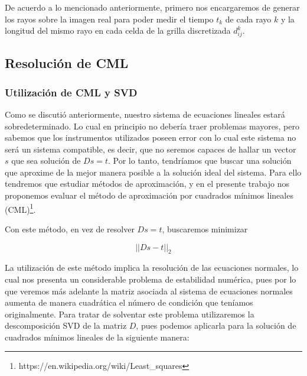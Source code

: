 De acuerdo a lo mencionado anteriormente, primero nos encargaremos de generar los rayos
sobre la imagen real para poder medir el tiempo $t_{k}$ de cada rayo $k$
y la longitud del mismo rayo en cada celda de la grilla discretizada $d^{k}_{ij}$.

\subsection{Resolución de CML}
\label{sec:cml}

\subsubsection{Utilización de CML y SVD} %
\label{sec:intro-cml}
Como se discutió anteriormente, nuestro sistema de ecuaciones lineales estará sobredeterminado.
Lo cual en principio no debería traer problemas mayores, pero sabemos que los instrumentos
utilizados poseen error con lo cual este sistema no será un sistema compatible,
es decir, que no seremos capaces de hallar un vector $s$ que sea solución de $Ds = t$.
Por lo tanto, tendríamos que buscar una solución que aproxime de la mejor manera posible a la solución ideal del sistema.
Para ello tendremos que estudiar métodos de aproximación,
y en el presente trabajo nos proponemos evaluar el método de aproximación
por cuadrados mínimos lineales (CML)\footnote{https://en.wikipedia.org/wiki/Least\_squares}.

Con este método, en vez de resolver $Ds = t$, buscaremos minimizar

\begin{equation*}
    ||Ds - t||_{2}
    \label{eq:1}
\end{equation*}

La utilización de este método implica la resolución de las ecuaciones normales,
lo cual nos presenta un considerable problema de estabilidad numérica,
pues por lo que veremos más adelante la matriz asociada al sistema de ecuaciones normales
aumenta de manera cuadrática el número de condición que teníamos originalmente.
Para tratar de solventar este problema utilizaremos la descomposición SVD\cite{burdenSVD} de la matriz $D$,
pues podemos aplicarla para la solución de cuadrados mínimos lineales de la siguiente manera:

